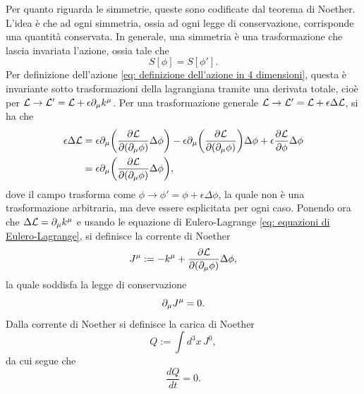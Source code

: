 Per quanto riguarda le simmetrie, queste sono codificate dal teorema di Noether. L'idea è che ad ogni simmetria, ossia ad ogni legge di conservazione, corrisponde una quantità conservata. In generale, una simmetria è una trasformazione che lascia invariata l'azione, ossia tale che 
\begin{equation}
    S[\phi] = S[\phi'].
\end{equation}
Per definizione dell'azione \eqref{eq: definizione dell'azione in 4 dimensioni}, questa è invariante sotto trasformazioni della lagrangiana tramite una derivata totale, cioè per $\mathcal{L} \to \mathcal{L}' = \mathcal{L} + \epsilon\partial_\mu k^\mu$. Per una trasformazione generale $\mathcal{L} \to \mathcal{L}' = \mathcal{L} + \epsilon\Delta\mathcal{L}$, si ha che 
\begin{equation}
    \begin{split}
        \epsilon\Delta\mathcal{L} &= \epsilon\partial_\mu\bigg(\frac{\partial\mathcal{L}}{\partial(\partial_\mu\phi)}\Delta\phi\bigg) - \epsilon\partial_\mu\bigg(\frac{\partial\mathcal{L}}{\partial(\partial_\mu\phi)}\bigg)\Delta\phi + \epsilon\frac{\partial\mathcal{L}}{\partial\phi}\Delta\phi \\
        &= \epsilon\partial_\mu\bigg(\frac{\partial\mathcal{L}}{\partial(\partial_\mu\phi)}\Delta\phi\bigg),
    \end{split}
\end{equation}
dove il campo trasforma come $\phi \to \phi' = \phi + \epsilon\Delta\phi$, la quale non è una trasformazione arbitraria, ma deve essere esplicitata per ogni caso. Ponendo ora che $\Delta\mathcal{L} = \partial_\mu k^\mu$ e usando le equazione di Eulero-Lagrange \eqref{eq: equazioni di Eulero-Lagrange}, si definisce la corrente di Noether
\begin{equation}
    J^\mu := -k^\mu + \frac{\partial\mathcal{L}}{\partial(\partial_\mu\phi)}\Delta\phi,
\end{equation}
la quale soddisfa la legge di conservazione 
\begin{equation}
\label{eq: legge di conservazione di Noether}
    \partial_\mu J^\mu = 0.
\end{equation}
Dalla corrente di Noether si definisce la carica di Noether
\begin{equation}
    Q := \int d^3x\,J^0,
\end{equation}
da cui segue che 
\begin{equation}
    \frac{dQ}{dt} = 0.
\end{equation}

